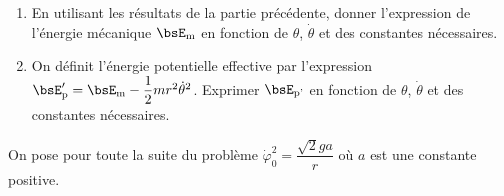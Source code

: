 \documentclass[a4paper,french,bookmarks]{article}
\begin{document}
    \begin{enumerate}
        \item En utilisant les résultats de la partie précédente, donner l'expression de l'énergie mécanique $\bsE_\text m$ en fonction de $\theta$, $\dot \theta$ et des constantes nécessaires.
        
        
        \item On définit l'énergie potentielle effective par l'expression $\bsE_\text p'= \bsE_\text m - \dfrac{1}{2}mr^2\dot \theta^2$. Exprimer $\bsE_\text{p'}$ en fonction de $\theta$, $\dot \theta$ et des constantes nécessaires.
        
    \end{enumerate}
    
    On pose pour toute la suite du problème $\dot \varphi_0^2 = \dfrac{\sqrt{2}ga}{r}$ où $a$ est une constante positive.
    
\end{document}
